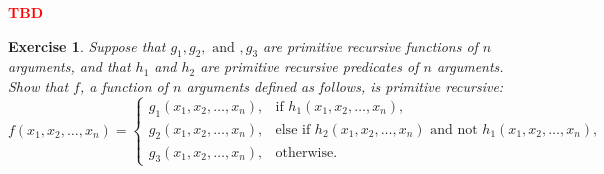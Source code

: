 \documentclass[11pt]{book}
\theoremstyle{definition}
\theoremstyle{plain}
\newtheorem{exercise}{Exercise}[chapter]
\theoremstyle{problemstyle}
\theoremstyle{remark}
\theoremstyle{definition}
\newcommand{\tbd}{
    \vspace{5mm}
    \textbf{\textcolor{red}{\Large{TBD}}}
    \vspace{5mm}
}
\begin{document}
    \tbd

\begin{exercise}
    \label{ex:3-2-primitive-recursive}
    Suppose that $g_1,g_2,\text{ and }, g_3$ are primitive recursive functions of $n$ arguments, and that $h_1$ and $h_2$ are primitive recursive predicates of $n$ arguments. Show that $f$, a function of $n$ arguments defined as follows, is primitive recursive:
    \begin{equation}
        \label{eq:3-primitive-recursive-predicates}
        f(x_1,x_2,\dots,x_n)=\begin{cases}
            g_1(x_1,x_2,\dots,x_n), & \text{if $h_1(x_1,x_2,\dots,x_n)$,}\\
            g_2(x_1,x_2,\dots,x_n), & \text{else if $h_2(x_1,x_2,\dots,x_n)$ and not $h_1(x_1,x_2,\dots,x_n)$,}\\
            g_3(x_1,x_2,\dots,x_n), & \text{otherwise.}
		 \end{cases}
    \end{equation}

\end{exercise}
\end{document}
